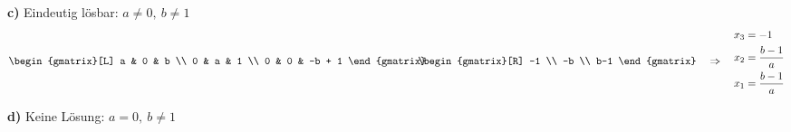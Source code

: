\begin{solution}
    \textbf{c)} Eindeutig lösbar: \( a \neq 0, \ b \neq 1\)
    \begin{equation*}
        \begin{gmatrix}[L]
            a & 0 & b \\
            0 & a & 1 \\
            0 & 0 & -b + 1
        \end{gmatrix} \hspace{-0.75em}
        \begin{gmatrix}[R]
            -1 \\ -b \\ b-1
        \end{gmatrix} \quad \Rightarrow \quad
        \begin{aligned}
            x_3 &= -1\\
            x_2 &= \frac{b - 1}{a}\\
            x_1 &= \frac{b - 1}{a}
        \end{aligned}
    \end{equation*}

    \textbf{d)} Keine Lösung: \( a = 0, \ b \neq 1\)

\end{solution}